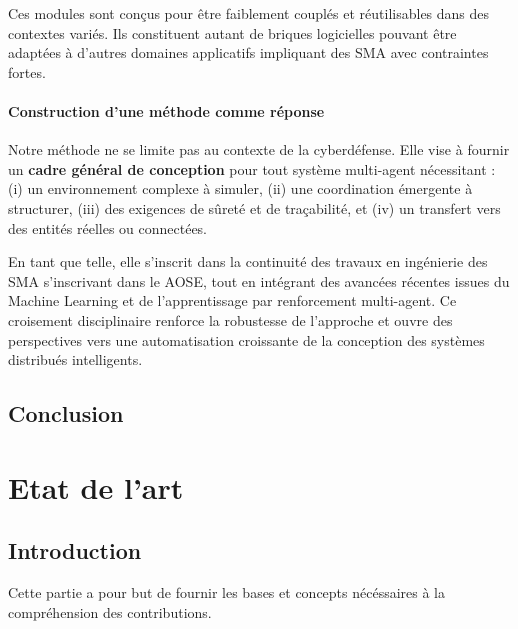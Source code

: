 \documentclass[ twoside,openright,titlepage,numbers=noenddot,headinclude,%
                footinclude=true,cleardoublepage=empty,abstractoff, %
                BCOR=5mm,paper=a4,fontsize=11pt,%
                french,american,%
                ]{scrreprt}
\begin{document}
Ces modules sont conçus pour être faiblement couplés et réutilisables dans des contextes variés. Ils constituent autant de briques logicielles pouvant être adaptées à d'autres domaines applicatifs impliquant des SMA avec contraintes fortes.



\subsection{Construction d'une méthode comme réponse}

Notre méthode ne se limite pas au contexte de la cyberdéfense. Elle vise à fournir un \textbf{cadre général de conception} pour tout système multi-agent nécessitant : (i) un environnement complexe à simuler, (ii) une coordination émergente à structurer, (iii) des exigences de sûreté et de traçabilité, et (iv) un transfert vers des entités réelles ou connectées.

En tant que telle, elle s'inscrit dans la continuité des travaux en ingénierie des SMA s'inscrivant dans le \ac{AOSE}, tout en intégrant des avancées récentes issues du Machine Learning et de l'apprentissage par renforcement multi-agent. Ce croisement disciplinaire renforce la robustesse de l'approche et ouvre des perspectives vers une automatisation croissante de la conception des systèmes distribués intelligents.


\chapter*{Conclusion}



\cleardoublepage
{}
{}
\part{Etat de l'art}

\chapter*{Introduction}
Cette partie a pour but de fournir les bases et concepts nécéssaires à la compréhension des contributions.
\end{document}
